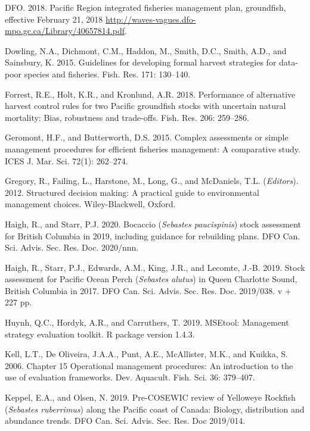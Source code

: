 \documentclass[11pt]{book}
\begin{document}
\leavevmode\hypertarget{ref-ifmp2018}{}%
DFO. 2018. Pacific Region integrated fisheries management plan, groundfish, effective February 21, 2018 \url{http://waves-vagues.dfo-mpo.gc.ca/Library/40657814.pdf}.

\leavevmode\hypertarget{ref-dowling2015a}{}%
Dowling, N.A., Dichmont, C.M., Haddon, M., Smith, D.C., Smith, A.D., and Sainsbury, K. 2015. Guidelines for developing formal harvest strategies for data-poor species and fisheries. Fish. Res. 171: 130--140.

\leavevmode\hypertarget{ref-forrest2018}{}%
Forrest, R.E., Holt, K.R., and Kronlund, A.R. 2018. Performance of alternative harvest control rules for two Pacific groundfish stocks with uncertain natural mortality: Bias, robustness and trade-offs. Fish. Res. 206: 259--286.

\leavevmode\hypertarget{ref-geromont2015}{}%
Geromont, H.F., and Butterworth, D.S. 2015. Complex assessments or simple management procedures for efficient fisheries management: A comparative study. ICES J. Mar. Sci. 72(1): 262--274.

\leavevmode\hypertarget{ref-gregory2012}{}%
Gregory, R., Failing, L., Harstone, M., Long, G., and McDaniels, T.L. (\emph{Editors}). 2012. Structured decision making: A practical guide to environmental management choices. Wiley-Blackwell, Oxford.

\leavevmode\hypertarget{ref-haigh2020}{}%
Haigh, R., and Starr, P.J. 2020. Bocaccio (\emph{Sebastes paucispinis}) stock assessment for British Columbia in 2019, including guidance for rebuilding plans. DFO Can. Sci. Advis. Sec. Res. Doc. 2020/nnn.

\leavevmode\hypertarget{ref-haigh2019}{}%
Haigh, R., Starr, P.J., Edwards, A.M., King, J.R., and Lecomte, J.-B. 2019. Stock assessment for Pacific Ocean Perch (\emph{Sebastes alutus}) in Queen Charlotte Sound, British Columbia in 2017. DFO Can. Sci. Advis. Sec. Res. Doc. 2019/038. v + 227 pp.

\leavevmode\hypertarget{ref-huynh_msetool_2019}{}%
Huynh, Q.C., Hordyk, A.R., and Carruthers, T. 2019. MSEtool: Management strategy evaluation toolkit. R package version 1.4.3.

\leavevmode\hypertarget{ref-kell2006}{}%
Kell, L.T., De Oliveira, J.A.A., Punt, A.E., McAllister, M.K., and Kuikka, S. 2006. Chapter 15 Operational management procedures: An introduction to the use of evaluation frameworks. Dev. Aquacult. Fish. Sci. 36: 379--407.

\leavevmode\hypertarget{ref-keppel2019}{}%
Keppel, E.A., and Olsen, N. 2019. Pre-COSEWIC review of Yelloweye Rockfish (\emph{Sebastes ruberrimus}) along the Pacific coast of Canada: Biology, distribution and abundance trends. DFO Can. Sci. Advis. Sec. Res. Doc 2019/014.
\end{document}
